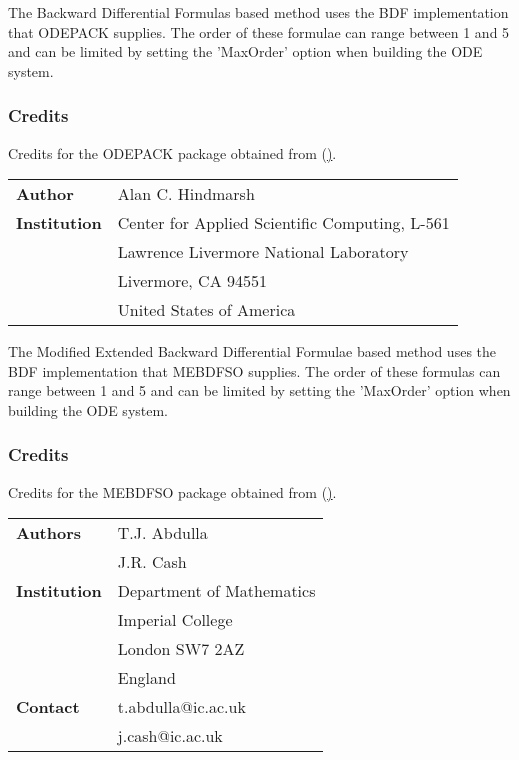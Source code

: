 \label{subsec:LSODEBDF}
The Backward Differential Formulas based method uses the BDF implementation that ODEPACK supplies. The order of these formulae can range between 1 and 5 and can be limited by setting the 'MaxOrder' option when building the ODE system.

\subsubsection{Credits}
Credits for the ODEPACK package obtained from (\hyperlink{http://www.netlib.org/}).

\vspace{0.5cm}
\begin{tabular}{ l l }
 \textbf{Author}      & Alan C. Hindmarsh \\
 \textbf{Institution} & Center for Applied Scientific Computing, L-561 \\
                      & Lawrence Livermore National Laboratory \\
                      & Livermore, CA 94551 \\
                      & United States of America \\
\end{tabular}
\label{subsec:MEBDFSO}
The Modified Extended Backward Differential Formulae based method uses the BDF implementation that MEBDFSO supplies. The order of these formulas can range between 1 and 5 and can be limited by setting the 'MaxOrder' option when building the ODE system.

\subsubsection{Credits}
Credits for the MEBDFSO package obtained from (\hyperlink{http://www.netlib.org/}).

\vspace{0.5cm}
\begin{tabular}{ l l }
 \textbf{Authors}     & T.J. Abdulla \\
                      & J.R. Cash \\
 \textbf{Institution} & Department of Mathematics \\
                      & Imperial College \\
                      & London SW7 2AZ \\
                      & England \\
 \textbf{Contact}     & t.abdulla@ic.ac.uk \\
                      & j.cash@ic.ac.uk \\
\end{tabular}

